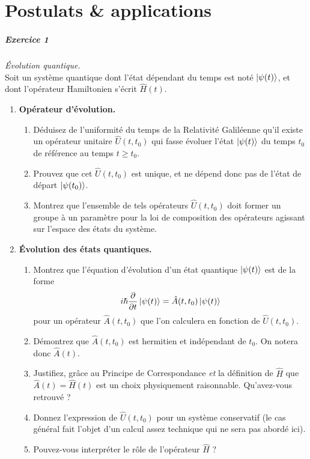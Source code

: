 \chapter{Postulats \& applications}

\paragraph{Exercice 1} \textit{Évolution quantique.}\\
Soit un système quantique dont l'état dépendant du temps est noté $\ket{\psi(t)}$, et dont l'opérateur Hamiltonien s'écrit $\hat H(t)$. 
\begin{enumerate}
\item \textbf{Opérateur d'évolution.}
\begin{enumerate}
\item Déduisez de l'uniformité du temps de la Relativité Galiléenne qu'il existe un opérateur unitaire $\hat U(t,t_0)$ qui fasse évoluer l'état $\ket{\psi(t)}$ du temps $t_0$ de référence au temps $t\geq t_0$. 
\item Prouvez que cet $\hat U(t,t_0)$ est unique, et ne dépend donc pas de l'état de départ $\ket{\psi(t_0)}$.
\item Montrez que l'ensemble de tels opérateurs $\hat U(t,t_0)$ doit former un groupe à un paramètre pour la loi de composition des opérateurs agissant sur l'espace des états du système.
\end{enumerate} 
\item \textbf{Évolution des états quantiques.}
\begin{enumerate}
\item Montrez que l'équation d'évolution d'un état quantique $\ket{\psi(t)}$ est de la forme 
\begin{equation}
i\hbar \frac{\partial}{\partial t}\ket{\psi(t)} = \hat A(t,t_0)\ket{\psi(t)}
\end{equation}
pour un opérateur $\hat A(t,t_0)$ que l'on calculera en fonction de $\hat U(t,t_0)$.
\item Démontrez que $\hat A(t,t_0)$ est hermitien et indépendant de $t_0$. On notera donc $\hat A(t)$.
\item Justifiez, grâce au Principe de Correspondance \textit{et} la définition de $\hat H$ que $\hat A(t) = \hat H(t)$ est un choix physiquement raisonnable. Qu'avez-vous retrouvé ?
\item Donnez l'expression de $\hat U(t,t_0)$ pour un système conservatif (le cas général fait l'objet d'un calcul assez technique qui ne sera pas abordé ici). 
\item Pouvez-vous interpréter le rôle de l'opérateur $\hat H$ ?
\end{enumerate}
\end{enumerate}



